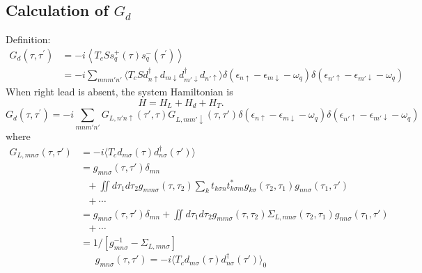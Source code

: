\documentclass[11pt,a4paper]{article}
\begin{document}
\subsection{Calculation of $G_{d}$}
Definition:
\begin{equation}
\begin{split}
G_{d}\left(\tau, \tau^{\prime}\right)&=
-i\left\langle T_{c} S s_{q}^{+}(\tau) s_{q}^{-}\left(\tau^{\prime}\right)\right\rangle \\
&=-i\sum_{mnm'n'}\langle T_{c}S d_{n \uparrow}^{\dagger} d_{m \downarrow} d_{m' \downarrow}^{\dagger} d_{n' \uparrow} \rangle \delta\left(\epsilon_{n \uparrow}-\epsilon_{m \downarrow}-\omega_{q}\right) \delta\left(\epsilon_{n' \uparrow}-\epsilon_{m' \downarrow}-\omega_{q}\right) 
\end{split}
\end{equation}
When right lead is absent, the system Hamiltonian is
\begin{equation}
H = H_{L} + H_{d} + H_{T}.
\end{equation}
\begin{equation}
G_{d}\left(\tau, \tau^{\prime}\right)=-i\sum_{mnm'n'}G_{L,n'n\uparrow}(\tau', \tau) G_{L,mm'\downarrow}(\tau, \tau') \delta\left(\epsilon_{n \uparrow}-\epsilon_{m \downarrow}-\omega_{q}\right) \delta\left(\epsilon_{n' \uparrow}-\epsilon_{m' \downarrow}-\omega_{q}\right)
\end{equation}
where
\begin{equation}
\begin{split}
G_{L,mn\sigma}(\tau, \tau')&= -i\langle T_{c}d_{m\sigma}(\tau) d_{n\sigma}^{\dag}(\tau')\rangle \\
&=g_{mn\sigma}(\tau, \tau')\delta_{mn} \\
&~~~+ \iint d\tau_{1}d\tau_{2} g_{mm\sigma}(\tau, \tau_{2}) \sum_{k} t_{k\sigma n}t_{k\sigma m}^{*} g_{k\sigma}(\tau_{2}, \tau_{1}) g_{nn\sigma}(\tau_{1}, \tau') \\
&~~~ +\cdots \\
&=g_{mn\sigma}(\tau, \tau')\delta_{mn} + \iint d\tau_{1}d\tau_{2} g_{mm\sigma}(\tau, \tau_{2}) \Sigma_{L,mn\sigma}(\tau_{2}, \tau_{1}) g_{nn\sigma}(\tau_{1}, \tau')\\
&~~~+ \cdots \\
&= 1 /\left[g_{mn \sigma}^{-1}-\Sigma_{L,mn \sigma}\right]
\end{split}
\end{equation}
\begin{equation}
g_{mn\sigma}(\tau, \tau') = -i\langle T_{c}d_{m\sigma}(\tau) d_{n\sigma}^{\dag}(\tau')\rangle_{0}
\end{equation}
\end{document}
